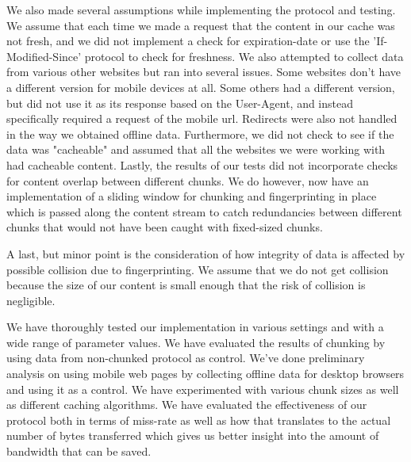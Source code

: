 We also made several assumptions while implementing the protocol and testing. We assume that each time we made a request that the content in our cache was not fresh, and we did not implement a check for expiration-date or use the 'If-Modified-Since' protocol to check for freshness. We also attempted to collect data from various other websites but ran into several issues. Some websites don't have a different version for mobile devices at all. Some others had a different version, but did not use it as its response based on the User-Agent, and instead specifically required a request of the mobile url. Redirects were also not handled in the way we obtained offline data. Furthermore, we did not check to see if the data was "cacheable" and assumed that all the websites we were working with had cacheable content. Lastly, the results of our tests did not incorporate checks for content overlap between different chunks. We do however, now have an implementation of a sliding window for chunking and fingerprinting in place which is passed along the content stream to catch redundancies between different chunks that would not have been caught with fixed-sized chunks. 

A last, but minor point is the consideration of how integrity of data is affected by possible collision due to fingerprinting. We assume that we do not get collision because the size of our content is small enough that the risk of collision is negligible. 

We have thoroughly tested our implementation in various settings and with a wide range of parameter values. We have evaluated the results of chunking by using data from non-chunked protocol as control. We've done preliminary analysis on using mobile web pages by collecting offline data for desktop browsers and using it as a control. We have experimented with various chunk sizes as well as different caching algorithms. We have evaluated the effectiveness of our protocol both in terms of miss-rate as well as how that translates to the actual number of bytes transferred which gives us better insight into the amount of bandwidth that can be saved. 
